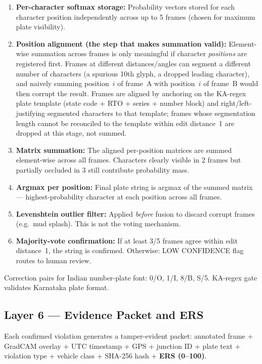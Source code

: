 \documentclass[11pt,a4paper]{article}
\begin{document}
\begin{enumerate}[itemsep=0.2em]
    \item \textbf{Per-character softmax storage:} Probability vectors stored for each character position independently across up to 5 frames (chosen for maximum plate visibility).
    \item \textbf{Position alignment (the step that makes summation valid):} Element-wise summation across frames is only meaningful if character \emph{positions} are registered first. Frames at different distances/angles can segment a different number of characters (a spurious 10th glyph, a dropped leading character), and naively summing position~$i$ of frame~A with position~$i$ of frame~B would then corrupt the result. Frames are aligned by anchoring on the KA-regex plate template (state code + RTO + series + number block) and right/left-justifying segmented characters to that template; frames whose segmentation length cannot be reconciled to the template within edit distance~1 are dropped at this stage, not summed.
    \item \textbf{Matrix summation:} The aligned per-position matrices are summed element-wise across all frames. Characters clearly visible in 2 frames but partially occluded in 3 still contribute probability mass.
    \item \textbf{Argmax per position:} Final plate string is argmax of the summed matrix — highest-probability character at each position across all frames.
    \item \textbf{Levenshtein outlier filter:} Applied \textit{before} fusion to discard corrupt frames (e.g.\ mud splash). This is not the voting mechanism.
    \item \textbf{Majority-vote confirmation:} If at least 3/5 frames agree within edit distance~1, the string is confirmed. Otherwise: LOW CONFIDENCE flag routes to human review.
\end{enumerate}

Correction pairs for Indian number-plate font: 0/O, 1/I, 8/B, S/5. KA-regex gate validates Karnataka plate format.

\subsection*{Layer 6 — Evidence Packet and ERS}

Each confirmed violation generates a tamper-evident packet: annotated frame + GradCAM overlay + UTC timestamp + GPS + junction ID + plate text + violation type + vehicle class + SHA-256 hash + \textbf{ERS (0–100)}.
\end{document}
